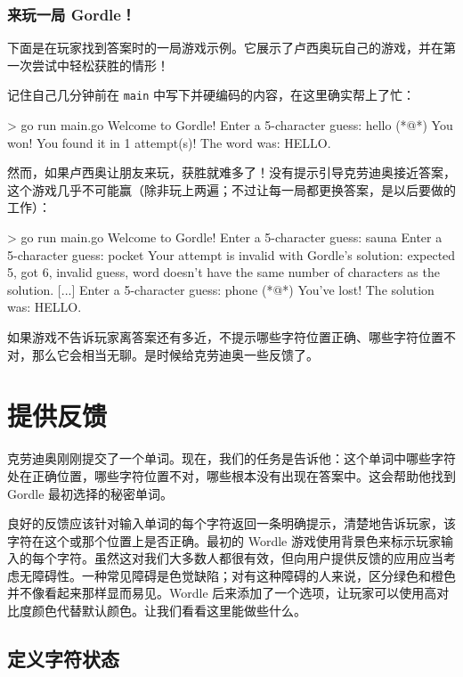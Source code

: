\subsubsection*{来玩一局 Gordle！}

下面是在玩家找到答案时的一局游戏示例。它展示了卢西奥玩自己的游戏，并在第一次尝试中轻松获胜的情形！

记住自己几分钟前在 \texttt{main} 中写下并硬编码的内容，在这里确实帮上了忙：

\begin{shellcode}[]
> go run main.go
Welcome to Gordle!
Enter a 5-character guess:
hello
(*@\PocketParty@*) You won! You found it in 1 attempt(s)! The word was: HELLO.
\end{shellcode}

然而，如果卢西奥让朋友来玩，获胜就难多了！没有提示引导克劳迪奥接近答案，这个游戏几乎不可能赢（除非玩上两遍；不过让每一局都更换答案，是以后要做的工作）：

\begin{shellcode}[]
> go run main.go
Welcome to Gordle!
Enter a 5-character guess:
sauna
Enter a 5-character guess:
pocket
Your attempt is invalid with Gordle's solution: expected 5, got 6, invalid
guess, word doesn't have the same number of characters as the solution.
[...]
Enter a 5-character guess:
phone
(*@\PocketSad@*) You've lost! The solution was: HELLO.
\end{shellcode}

如果游戏不告诉玩家离答案还有多近，不提示哪些字符位置正确、哪些字符位置不对，那么它会相当无聊。是时候给克劳迪奥一些反馈了。

\section{提供反馈}

克劳迪奥刚刚提交了一个单词。现在，我们的任务是告诉他：这个单词中哪些字符处在正确位置，哪些字符位置不对，哪些根本没有出现在答案中。这会帮助他找到 Gordle 最初选择的秘密单词。

良好的反馈应该针对输入单词的每个字符返回一条明确提示，清楚地告诉玩家，该字符在这个或那个位置上是否正确。最初的 Wordle 游戏使用背景色来标示玩家输入的每个字符。虽然这对我们大多数人都很有效，但向用户提供反馈的应用应当考虑无障碍性。一种常见障碍是色觉缺陷；对有这种障碍的人来说，区分绿色和橙色并不像看起来那样显而易见。Wordle 后来添加了一个选项，让玩家可以使用高对比度颜色代替默认颜色。让我们看看这里能做些什么。

\subsection{定义字符状态}

